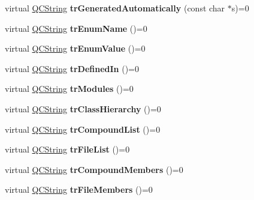 \begin{DoxyCompactItemize}
virtual \mbox{\hyperlink{class_q_c_string}{Q\+C\+String}} {\bfseries tr\+Generated\+Automatically} (const char $\ast$s)=0
\item 
\mbox{\label{class_translator_abc6078e0cfddec33bfd37104629c8aa5}} 
virtual \mbox{\hyperlink{class_q_c_string}{Q\+C\+String}} {\bfseries tr\+Enum\+Name} ()=0
\item 
\mbox{\label{class_translator_ac967d215eaeada1586591ff86fcb27ee}} 
virtual \mbox{\hyperlink{class_q_c_string}{Q\+C\+String}} {\bfseries tr\+Enum\+Value} ()=0
\item 
\mbox{\label{class_translator_adcf22e25b6f53f1e98a5461fa6fd4615}} 
virtual \mbox{\hyperlink{class_q_c_string}{Q\+C\+String}} {\bfseries tr\+Defined\+In} ()=0
\item 
\mbox{\label{class_translator_a30ab06b4873f2a1147790b1f19070daa}} 
virtual \mbox{\hyperlink{class_q_c_string}{Q\+C\+String}} {\bfseries tr\+Modules} ()=0
\item 
\mbox{\label{class_translator_aa0239ddf927f682dd691ea075cb8c675}} 
virtual \mbox{\hyperlink{class_q_c_string}{Q\+C\+String}} {\bfseries tr\+Class\+Hierarchy} ()=0
\item 
\mbox{\label{class_translator_af66045c049fb505e2e09605d641f2ff2}} 
virtual \mbox{\hyperlink{class_q_c_string}{Q\+C\+String}} {\bfseries tr\+Compound\+List} ()=0
\item 
\mbox{\label{class_translator_ac461556d9c97028bde87745fdc97b3cb}} 
virtual \mbox{\hyperlink{class_q_c_string}{Q\+C\+String}} {\bfseries tr\+File\+List} ()=0
\item 
\mbox{\label{class_translator_a6c32b990a668865e04330007c37ecb2a}} 
virtual \mbox{\hyperlink{class_q_c_string}{Q\+C\+String}} {\bfseries tr\+Compound\+Members} ()=0
\item 
\mbox{\label{class_translator_ab1ae470cc9c32e47bdebde8141940ffe}} 
virtual \mbox{\hyperlink{class_q_c_string}{Q\+C\+String}} {\bfseries tr\+File\+Members} ()=0
\item 

\end{DoxyCompactItemize}
